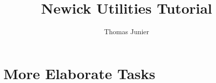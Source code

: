 \documentclass[a4paper,10pt]{report}
\title{Newick Utilities Tutorial}
\author{Thomas Junier}
\theoremstyle{definition}
\theoremstyle{definition}
\begin{document}
\maketitle
\tableofcontents






\chapter{More Elaborate Tasks}
\label{chap_adv}

\appendix




\end{document}
